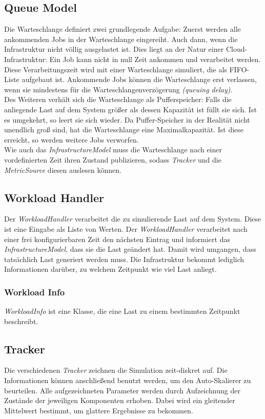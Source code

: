 \subsection{Queue Model}
\label{sec:aufbau:QueueModel}
Die Warteschlange definiert zwei grundlegende Aufgabe: Zuerst werden alle ankommenden Jobs in der Warteschlange eingereiht. Auch dann, wenn die Infrastruktur nicht völlig ausgelastet ist. Dies liegt an der Natur einer Cloud-Infrastruktur: Ein Job kann nicht in null Zeit ankommen und verarbeitet werden. Diese Verarbeitungszeit wird mit einer Warteschlange simuliert, die als FIFO-Liste aufgebaut ist. Ankommende Jobs können die Warteschlange erst verlassen, wenn sie mindestens für die Warteschlangenverzögerung \textit{(queuing delay)}. \\
Des Weiteren verhält sich die Warteschlange als Pufferspeicher: Falls die anliegende Last auf dem System größer als dessen Kapazität ist füllt sie sich. Ist es umgekehrt, so leert sie sich wieder. Da Puffer-Speicher in der Realität nicht unendlich groß sind, hat die Warteschlange eine Maximalkapazität. Ist diese erreicht, so werden weitere Jobs verworfen. \\
Wie auch das \textit{InfrastructureModel} muss die Warteschlange nach einer vordefinierten Zeit ihren Zustand publizieren, sodass \textit{Tracker} und die \textit{MetricSource} diesen auslesen können.

\subsection{Workload Handler}
Der \textit{WorkloadHandler} verarbeitet die zu simulierende Last auf dem System. Diese ist eine Eingabe als Liste von Werten. Der \textit{WorkloadHandler} verarbeitet nach einer frei konfigurierbaren Zeit den nächsten Eintrag und informiert das \textit{InfrastructureModel}, dass sie die Last geändert hat. Damit wird umgangen, dass tatsächlich Last generiert werden muss. Die Infrastruktur bekommt lediglich Informationen darüber, zu welchem Zeitpunkt wie viel Last anliegt. 

\subsubsection{Workload Info}
\textit{WorkloadInfo} ist eine Klasse, die eine Last zu einem bestimmten Zeitpunkt beschreibt.

\subsection{Tracker}
Die verschiedenen \textit{Tracker} zeichnen die Simulation zeit-diskret auf. Die Informationen können anschließend benutzt werden, um den Auto-Skalierer zu beurteilen. Alle aufgezeichneten Parameter werden durch Aufzeichnung der Zustände der jeweiligen Komponenten erhoben. Dabei wird ein gleitender Mittelwert bestimmt, um glattere Ergebnisse zu bekommen.

